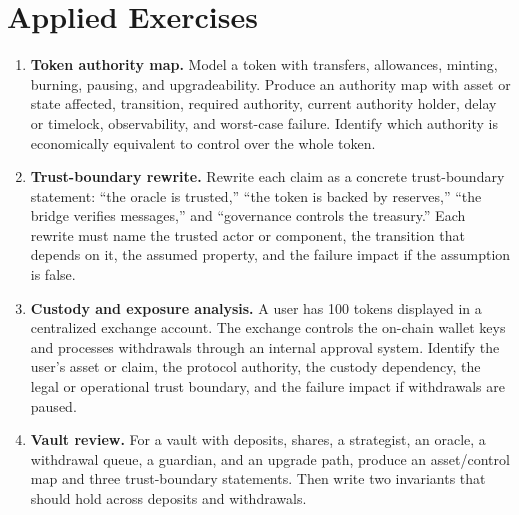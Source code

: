 \section*{Applied Exercises}

\begin{enumerate}
\item \textbf{Token authority map.} Model a token with transfers, allowances, minting, burning, pausing, and upgradeability. Produce an authority map with asset or state affected, transition, required authority, current authority holder, delay or timelock, observability, and worst-case failure. Identify which authority is economically equivalent to control over the whole token.

\item \textbf{Trust-boundary rewrite.} Rewrite each claim as a concrete trust-boundary statement: ``the oracle is trusted,'' ``the token is backed by reserves,'' ``the bridge verifies messages,'' and ``governance controls the treasury.'' Each rewrite must name the trusted actor or component, the transition that depends on it, the assumed property, and the failure impact if the assumption is false.

\item \textbf{Custody and exposure analysis.} A user has 100 tokens displayed in a centralized exchange account. The exchange controls the on-chain wallet keys and processes withdrawals through an internal approval system. Identify the user's asset or claim, the protocol authority, the custody dependency, the legal or operational trust boundary, and the failure impact if withdrawals are paused.

\item \textbf{Vault review.} For a vault with deposits, shares, a strategist, an oracle, a withdrawal queue, a guardian, and an upgrade path, produce an asset/control map and three trust-boundary statements. Then write two invariants that should hold across deposits and withdrawals.
\end{enumerate}

